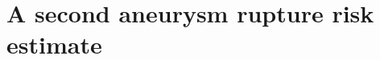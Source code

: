 \documentclass[../conclusions.tex]{subfiles}
\begin{document}
    
\section{A second aneurysm rupture risk estimate}
\end{document}
